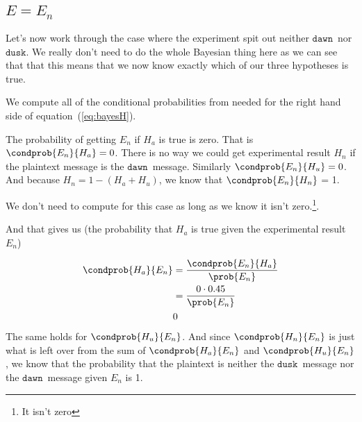 \documentclass{article}
\newcommand\mdusk{\ensuremath{\mathtt{dusk}}}
\newcommand\mdawn{\ensuremath{\mathtt{dawn}}}
\begin{document}
\subsection{\(E = E_n\)}

Let's now work through the case where the experiment spit out neither \mdawn\ nor \mdusk. We really don't need to do the whole Bayesian thing here as we can see that that this means that we now know exactly which of our three hypotheses is true. 


We compute all of the conditional probabilities from needed for the right hand side of equation~(\ref{eq:bayesH}).


The probability of getting $E_n$ if $H_a$ is true is zero. That is
$\condprob{E_n}{H_a} = 0$.
There is no way we could get experimental result $H_n$ if the plaintext message is the \mdawn\ message.
Similarly 
$\condprob{E_n}{H_u} = 0$.
And because $H_n = 1 - (H_a + H_u)$, we know that $\condprob{E_n}{H_n}$ = 1.

We don't need to compute  for this case as long as we know it isn't zero.\footnote{It isn't zero}.

And that gives us  (the probability that $H_a$ is true given the experimental result $E_n$)

\begin{align*}
    \condprob{H_a}{E_n} &= \frac{\condprob{E_n}{H_a}}{\prob{E_n}} \\
                        &= \frac{0 \cdot 0.45}{\prob{E_n}} \\
                        & 0 
\end{align*}
The same holds for $\condprob{H_u}{E_n}$. And since $\condprob{H_n}{E_n}$ is just what is left over from the sum of  $\condprob{H_a}{E_n}$ and $\condprob{H_u}{E_n}$, we know that the probability that the plaintext is neither the \mdusk\ message nor the \mdawn\ message given $E_n$ is 1.
\end{document}
